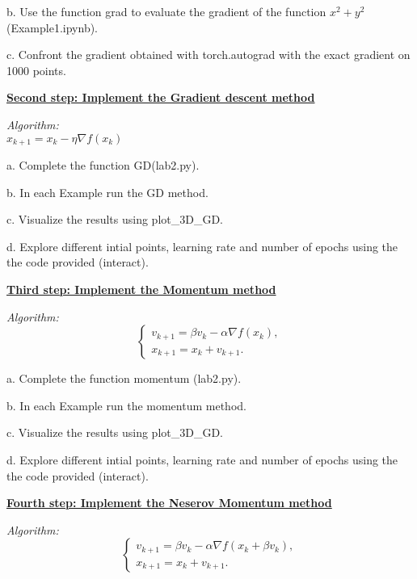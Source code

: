 \documentclass{article}
\newcommand{\step}[1]{\underline{\textbf{\large{#1}}} }
\begin{document}
    b. Use the function grad to evaluate the gradient of the function $x^2+y^2$ (Example1.ipynb).

    c. Confront the gradient obtained with torch.autograd with the exact gradient on 1000 points. 

    \begin{center}\step{Second step: Implement the Gradient descent method}\end{center}
    
    \begin{center}\textit{Algorithm:} \\ $x_{k+1} = x_{k} - \eta \nabla f(x_{k})$ \end{center}

    a. Complete the function GD(lab2.py).

    b. In each Example run the GD method.

    c. Visualize the results using plot\_3D\_GD.

    d. Explore different intial points, learning rate and number of epochs using the the code provided (interact).

  \begin{center}\step{Third step: Implement the Momentum method}\end{center}
    
  \begin{center}\textit{Algorithm:} 
    \begin{equation*}
      \begin{cases*}
        v_{k+1} = \beta v_k  -\alpha \nabla f(x_k),\\
        x_{k+1} = x_k + v_{k+1}.
      \end{cases*}
    \end{equation*}
  \end{center}
  \newpage
  \restoregeometry
    a. Complete the function momentum (lab2.py).

    b. In each Example run the momentum method.

    c. Visualize the results using plot\_3D\_GD.

    d. Explore different intial points, learning rate and number of epochs using the the code provided (interact).

\begin{center}\step{Fourth step: Implement the Neserov Momentum method}\end{center}
  \begin{center}\textit{Algorithm:} 
    \begin{equation*}
      \begin{cases*}
        v_{k+1} = \beta v_k  -\alpha \nabla f(x_k + \beta v_k),\\
        x_{k+1} = x_k + v_{k+1}.
      \end{cases*}
    \end{equation*}
  \end{center} 
\end{document}
